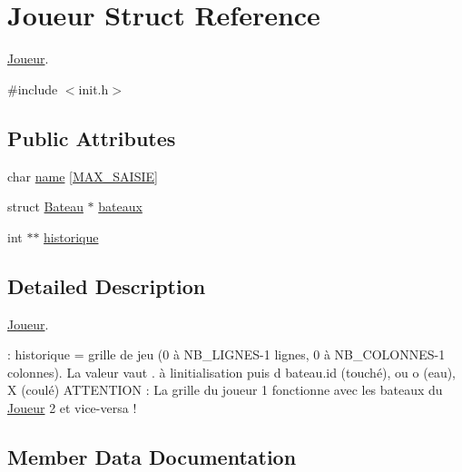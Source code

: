 \hypertarget{structJoueur}{}\section{Joueur Struct Reference}
\label{structJoueur}


\hyperlink{structJoueur}{Joueur}.  




{\ttfamily \#include $<$init.\+h$>$}

\subsection*{Public Attributes}
\begin{DoxyCompactItemize}
\item 
char \hyperlink{structJoueur_ab612f3b383ec2463e302d1f8ba5fc4fd}{name} \mbox{[}\hyperlink{init_8h_a2277af00d169389a0db61a0dbefa2e05}{M\+A\+X\+\_\+\+S\+A\+I\+S\+IE}\mbox{]}
\item 
struct \hyperlink{structBateau}{Bateau} $\ast$ \hyperlink{structJoueur_a950c3ca390a307cfd21d7095b4d5554e}{bateaux}
\item 
int $\ast$$\ast$ \hyperlink{structJoueur_a592804f8ad7d125fabdf06bbbffd60c2}{historique}
\end{DoxyCompactItemize}


\subsection{Detailed Description}
\hyperlink{structJoueur}{Joueur}. 

\+: historique = grille de jeu (0 à N\+B\+\_\+\+L\+I\+G\+N\+E\+S-\/1 lignes, 0 à N\+B\+\_\+\+C\+O\+L\+O\+N\+N\+E\+S-\/1 colonnes). La valeur vaut \textquotesingle{}.\textquotesingle{} à l\textquotesingle{}initialisation puis \textquotesingle{}d\textquotesingle{} bateau.\+id (touché), ou \textquotesingle{}o\textquotesingle{} (eau), \textquotesingle{}X\textquotesingle{} (coulé) A\+T\+T\+E\+N\+T\+I\+ON \+: La grille du joueur 1 fonctionne avec les bateaux du \hyperlink{structJoueur}{Joueur} 2 et vice-\/versa ! 

\subsection{Member Data Documentation}
\hypertarget{structJoueur_a950c3ca390a307cfd21d7095b4d5554e}{}\label{structJoueur_a950c3ca390a307cfd21d7095b4d5554e} 
